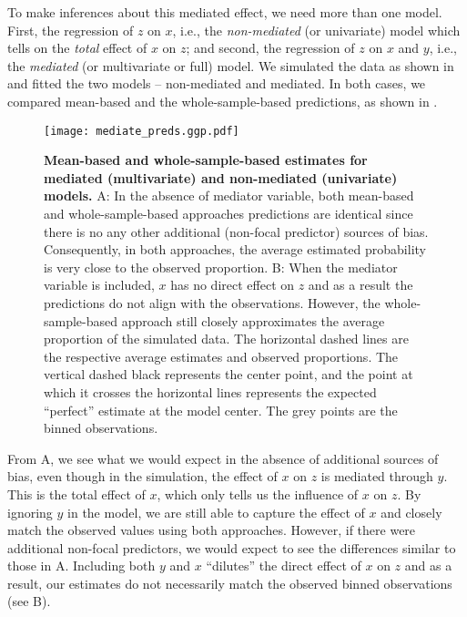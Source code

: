To make inferences about this mediated effect, we need more than one model. First, the regression of $z$ on $x$, i.e., the \emph{non-mediated} (or univariate) model which tells on the \emph{total} effect of $x$ on $z$; and second, the regression of $z$ on $x$ and $y$, i.e., the \emph{mediated} (or multivariate or full) model. We simulated the data as shown in  and fitted the two models -- non-mediated and mediated. In both cases, we compared mean-based and the whole-sample-based predictions, as shown in .

\begin{figure}
\begin{center}
\texttt{[image: mediate\_preds.ggp.pdf]}
\end{center}
\caption{{\bf Mean-based and whole-sample-based estimates for mediated (multivariate) and non-mediated (univariate) models.} A: In the absence of mediator variable, both mean-based and whole-sample-based approaches predictions are identical since there is no any other additional (non-focal predictor) sources of bias. Consequently, in both approaches, the average estimated probability is very close to the observed proportion. B: When the mediator variable is included,  $x$ has no direct effect on $z$ and as a result the predictions do not align with the observations. However, the whole-sample-based approach still closely approximates the average proportion of the simulated data. The horizontal dashed lines are the respective average estimates and observed proportions. The vertical dashed black represents the center point, and the point at which it crosses the horizontal lines represents the expected ``perfect'' estimate at the model center. The grey points are the binned observations.}
\label{fig:pred_mediated_plots}
\end{figure}

From A, we see what we would expect in the absence of additional sources of bias, even though in the simulation, the effect of $x$ on $z$ is mediated through $y$. This is the total effect of $x$, which only tells us the influence of $x$ on $z$. By ignoring $y$ in the model, we are still able to capture the effect of $x$ and closely match the observed values using both approaches. However, if there were additional non-focal predictors, we would expect to see the differences similar to those in A. Including both $y$ and $x$ ``dilutes'' the direct effect of $x$ on $z$ and as a result, our estimates do not necessarily match the observed binned observations (see B).


